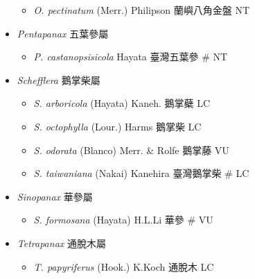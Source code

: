 \begin{itemize}
  \begin{itemize}
        \item[] \textit{O. pectinatum} (Merr.) Philipson  蘭嶼八角金盤   NT
  \end{itemize}
 \item[] \textit{Pentapanax} 五葉參屬
                                
  \begin{itemize}
        \item[] \textit{P. castanopsisicola} Hayata  臺灣五葉參  \# NT
  \end{itemize}
 \item[] \textit{Schefflera} 鵝掌柴屬
                                
  \begin{itemize}
        \item[] \textit{S. arboricola} (Hayata) Kaneh.  鵝掌蘗   LC
        \item[] \textit{S. octophylla} (Lour.) Harms  鵝掌柴   LC
        \item[] \textit{S. odorata} (Blanco) Merr. \& Rolfe  鵝掌藤   VU
        \item[] \textit{S. taiwaniana} (Nakai) Kanehira  臺灣鵝掌柴  \# LC
  \end{itemize}
 \item[] \textit{Sinopanax} 華參屬
                                
  \begin{itemize}
        \item[] \textit{S. formosana} (Hayata) H.L.Li  華參  \# VU
  \end{itemize}
 \item[] \textit{Tetrapanax} 通脫木屬
                                
  \begin{itemize}
        \item[] \textit{T. papyriferus} (Hook.) K.Koch  通脫木   LC
  \end{itemize}
  \end{itemize}
